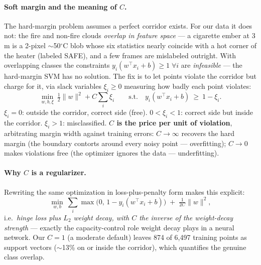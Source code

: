 \documentclass[11pt]{article}
\begin{document}
\paragraph{Soft margin and the meaning of $C$.}
The hard-margin problem assumes a perfect corridor exists. For our data it
does not: the fire and non-fire clouds \emph{overlap in feature space} ---
a cigarette ember at 3\,m is a 2-pixel $\sim$50$^\circ$C blob whose six
statistics nearly coincide with a hot corner of the heater (labeled SAFE),
and a few frames are mislabeled outright. With overlapping classes the
constraints $y_i(w^\top x_i+b)\geq1\;\forall i$ are \emph{infeasible} ---
the hard-margin SVM has no solution. The fix is to let points violate the
corridor but charge for it, via slack variables $\xi_i\geq0$ measuring how
badly each point violates:
\[
\min_{w,b,\xi}\ \tfrac12\|w\|^2 + C\sum_i \xi_i
\qquad\text{s.t.}\quad y_i(w^\top x_i+b)\ \geq\ 1-\xi_i .
\]
$\xi_i{=}0$: outside the corridor, correct side (free). $0{<}\xi_i{<}1$:
correct side but inside the corridor. $\xi_i{>}1$: misclassified.
\textbf{$C$ is the price per unit of violation}, arbitrating margin width
against training errors: $C\to\infty$ recovers the hard margin (the
boundary contorts around every noisy point --- overfitting); $C\to0$ makes
violations free (the optimizer ignores the data --- underfitting).

\paragraph{Why $C$ is a regularizer.}
Rewriting the same optimization in loss-plus-penalty form makes this
explicit:
\[
\min_{w,b}\ \sum_i \max\bigl(0,\,1-y_i(w^\top x_i+b)\bigr)
\;+\; \tfrac{1}{2C}\|w\|^2 ,
\]
i.e.\ \emph{hinge loss plus $L_2$ weight decay, with $C$ the inverse of
the weight-decay strength} --- exactly the capacity-control role weight
decay plays in a neural network. Our $C{=}1$ (a moderate default) leaves
874 of 6{,}497 training points as support vectors ($\sim$13\% on or inside
the corridor), which quantifies the genuine class overlap.
\end{document}
